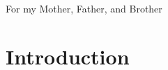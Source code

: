 \documentclass[fullpage]{uiucthesis2009}
\begin{document}

\begin{dedication}
For my Mother, Father, and Brother
\end{dedication}


%


%
%
%
\tableofcontents
%
%
%
%

\mainmatter

\chapter{Introduction}
\label{sec:intro}

\end{document}
